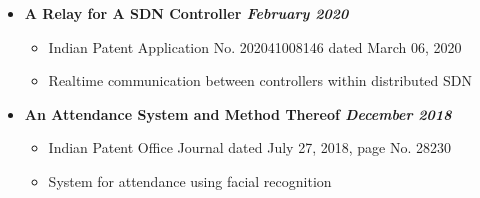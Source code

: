 \documentclass[9]{Resume}
\begin{document}
\begin{itemize}[noitemsep,nolistsep]
    \item[]\textbf{A Relay for A SDN Controller \hfill \textit{February 2020}}
        \begin{itemize}[leftmargin=*]
            \setlength\itemsep{-0.25em}
            \item[\textbullet]Indian Patent Application No. 202041008146 dated March 06, 2020
            \item[\textbullet]Realtime communication between controllers within distributed SDN
        \end{itemize}
    \item[]\textbf{An Attendance System and Method Thereof \hfill \textit{December 2018}}
        \begin{itemize}[leftmargin=*]
            \setlength\itemsep{-0.25em}
            \item[\textbullet]Indian Patent Office Journal dated July 27, 2018, page No. 28230
            \item[\textbullet]System for attendance using facial recognition
        \end{itemize}
\end{itemize}
\end{document}
